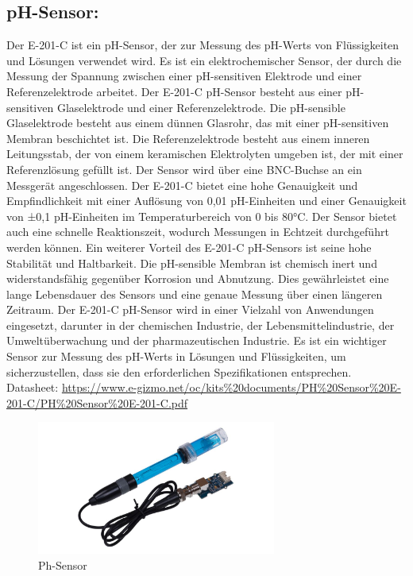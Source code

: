 \newpage
\subsection*{pH-Sensor:}
Der E-201-C ist ein pH-Sensor, der zur Messung des pH-Werts von Flüssigkeiten und Lösungen verwendet wird. Es ist ein elektrochemischer Sensor, der durch die Messung der Spannung zwischen einer pH-sensitiven Elektrode und einer Referenzelektrode arbeitet.
Der E-201-C pH-Sensor besteht aus einer pH-sensitiven Glaselektrode und einer Referenzelektrode. Die pH-sensible Glaselektrode besteht aus einem dünnen Glasrohr, das mit einer pH-sensitiven Membran beschichtet ist. Die Referenzelektrode besteht aus einem inneren Leitungsstab, der von einem keramischen Elektrolyten umgeben ist, der mit einer Referenzlösung gefüllt ist. Der Sensor wird über eine BNC-Buchse an ein Messgerät angeschlossen.
Der E-201-C bietet eine hohe Genauigkeit und Empfindlichkeit mit einer Auflösung von 0,01 pH-Einheiten und einer Genauigkeit von ±0,1 pH-Einheiten im Temperaturbereich von 0 bis 80°C. Der Sensor bietet auch eine schnelle Reaktionszeit, wodurch Messungen in Echtzeit durchgeführt werden können.
Ein weiterer Vorteil des E-201-C pH-Sensors ist seine hohe Stabilität und Haltbarkeit. Die pH-sensible Membran ist chemisch inert und widerstandsfähig gegenüber Korrosion und Abnutzung. Dies gewährleistet eine lange Lebensdauer des Sensors und eine genaue Messung über einen längeren Zeitraum.
Der E-201-C pH-Sensor wird in einer Vielzahl von Anwendungen eingesetzt, darunter in der chemischen Industrie, der Lebensmittelindustrie, der Umweltüberwachung und der pharmazeutischen Industrie. Es ist ein wichtiger Sensor zur Messung des pH-Werts in Lösungen und Flüssigkeiten, um sicherzustellen, dass sie den erforderlichen Spezifikationen entsprechen. 
\newline
Datasheet: \url{https://www.e-gizmo.net/oc/kits%20documents/PH%20Sensor%20E-201-C/PH%20Sensor%20E-201-C.pdf}

\begin{figure}[b]
    \centering
    \includegraphics[width=0.7\textwidth]{./pics/pHSensorBild.jpeg}
    \caption{Ph-Sensor}
    \label{fig:TTGO-ESP32}
\end{figure}

